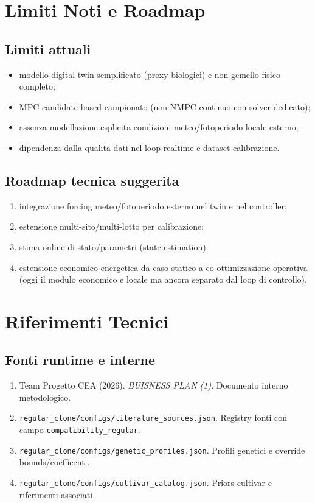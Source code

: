 ﻿\documentclass[11pt,a4paper]{report}
\begin{document}
\newpage
\chapter{Limiti Noti e Roadmap}

\section{Limiti attuali}
\begin{itemize}
  \item modello digital twin semplificato (proxy biologici) e non gemello fisico completo;
  \item MPC candidate-based campionato (non NMPC continuo con solver dedicato);
  \item assenza modellazione esplicita condizioni meteo/fotoperiodo locale esterno;
  \item dipendenza dalla qualita dati nel loop realtime e dataset calibrazione.
\end{itemize}

\section{Roadmap tecnica suggerita}
\begin{enumerate}
  \item integrazione forcing meteo/fotoperiodo esterno nel twin e nel controller;
  \item estensione multi-sito/multi-lotto per calibrazione;
  \item stima online di stato/parametri (state estimation);
  \item estensione economico-energetica da caso statico a co-ottimizzazione operativa (oggi il modulo economico e locale ma ancora separato dal loop di controllo).
\end{enumerate}

\newpage
\chapter{Riferimenti Tecnici}

\section{Fonti runtime e interne}
\begin{enumerate}
  \item Team Progetto CEA (2026). \emph{BUISNESS PLAN (1)}. Documento interno metodologico.
  \item \texttt{regular\_clone/configs/literature\_sources.json}. Registry fonti con campo \texttt{compatibility\_regular}.
  \item \texttt{regular\_clone/configs/genetic\_profiles.json}. Profili genetici e override bounds/coefficenti.
  \item \texttt{regular\_clone/configs/cultivar\_catalog.json}. Priors cultivar e riferimenti associati.
\end{enumerate}
\end{document}
